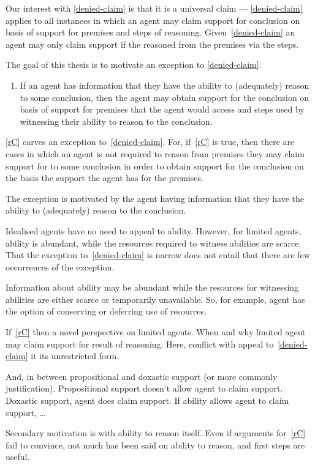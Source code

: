 \begin{note}[Alternative]
  Our interest with \ref{denied-claim} is that it is a universal claim --- \ref{denied-claim} applies to all instances in which an agent may claim support for conclusion on basis of support for premises and steps of reasoning.
  Given~\ref{denied-claim} an agent may only claim support if the reasoned from the premises via the steps.

  The goal of this thesis is to motivate an exception to \ref{denied-claim}.

  \begin{enumerate}[label=\rC{}, ref=\rC{}]
  \item\label{rC} If an agent has information that they have the ability to (adequately) reason to some conclusion, then the agent may obtain support for the conclusion on basis of support for premises that the agent would access and steps used by witnessing their ability to reason to the conclusion.
  \end{enumerate}

  \ref{rC} carves an exception to~\ref{denied-claim}.
  For, if~\ref{rC} is true, then there are cases in which an agent is not required to reason from premises they may claim support for to some conclusion in order to obtain support for the conclusion on the basis the support the agent has for the premises.
\end{note}

\begin{note}[Ability]
  The exception is motivated by the agent having information that they have the ability to (adequately) reason to the conclusion.

  Idealised agents have no need to appeal to ability.
  However, for limited agents, ability is abundant, while the resources required to witness abilities are scarce.
  That the exception to~\ref{denied-claim} is narrow does not entail that there are few occurrences of the exception.

  Information about ability may be abundant while the resources for witnessing abilities are either scarce or temporarily unavailable.
  So, for example, agent has the option of conserving or deferring use of resources.

  If~\ref{rC} then a novel perspective on limited agents.
  When and why limited agent may claim support for result of reasoning.
  Here, conflict with appeal to~\ref{denied-claim} it its unrestricted form.

  And, in between propositional and doxastic support (or more commonly justification).
  Propositional support doesn't allow agent to claim support.
  Doxastic support, agent does claim support.
  If ability allows agent to claim support, \dots

  Secondary motivation is with ability to reason itself.
  Even if arguments for~\ref{rC} fail to convince, not much has been said on ability to reason, and first steps are useful.

  
\end{note}

